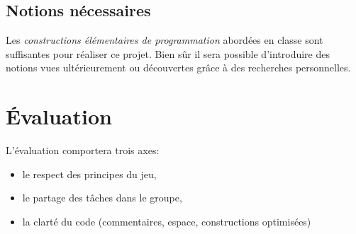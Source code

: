\documentclass[a4paper,11pt]{article}
\begin{document}
\begin{Form}
\subsection{Notions nécessaires}
Les \emph{constructions élémentaires de programmation} abordées en classe sont suffisantes pour réaliser ce projet. Bien sûr il sera possible d'introduire des notions vues ultérieurement ou découvertes grâce à des recherches personnelles.
\section{Évaluation}
L'évaluation comportera trois axes:
\begin{itemize}
\item le respect des principes du jeu,
\item le partage des tâches dans le groupe,
\item la clarté du code (commentaires, espace, constructions optimisées)
\end{itemize}
\end{Form}
\end{document}
